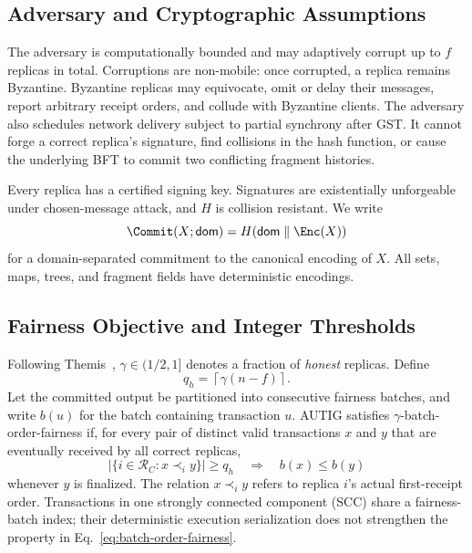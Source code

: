 \subsection{Adversary and Cryptographic Assumptions}

The adversary is computationally bounded and may adaptively corrupt up to $f$
replicas in total.  Corruptions are non-mobile: once corrupted, a replica
remains Byzantine.  Byzantine replicas may equivocate, omit or delay their messages,
report arbitrary receipt orders, and collude with Byzantine clients.  The
adversary also schedules network delivery subject to partial synchrony after
GST.  It cannot forge a correct replica's signature, find collisions in the
hash function, or cause the underlying BFT to commit two conflicting fragment
histories.

Every replica has a certified signing key.  Signatures are existentially
unforgeable under chosen-message attack, and $H$ is collision resistant.  We
write
\[
 \Commit(X;\mathsf{dom})
   =H(\mathsf{dom}\parallel\Enc(X))
\]
for a domain-separated commitment to the canonical encoding of $X$.  All
sets, maps, trees, and fragment fields have deterministic encodings.

\subsection{Fairness Objective and Integer Thresholds}
\label{sec:fairness-objective}

Following Themis~\cite{kelkar2023themis}, $\gamma\in(1/2,1]$
denotes a fraction of \emph{honest} replicas.  Define
\[
 q_h=\left\lceil\gamma(n-f)\right\rceil.
\]
Let the committed output be partitioned into consecutive fairness batches, and
write $b(u)$ for the batch containing transaction $u$.  AUTIG satisfies
$\gamma$-batch-order-fairness if, for every pair of distinct valid transactions
$x$ and $y$ that are eventually received by all correct replicas,
\[
 \left|\{i\in\mathcal R_C:x\prec_i y\}\right|\ge q_h
 \quad\Longrightarrow\quad b(x)\le b(y)
 \tag{1}\label{eq:batch-order-fairness}
\]
whenever $y$ is finalized.  The relation $x\prec_i y$ refers to replica $i$'s
actual first-receipt order.  Transactions in one strongly connected component
(SCC) share a fairness-batch index; their deterministic execution
serialization does not strengthen the property in
Eq.~\eqref{eq:batch-order-fairness}.

